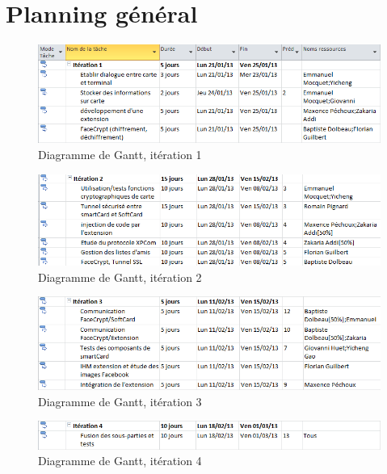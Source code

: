 \documentclass[a4paper,11pt,french]{article}
\begin{document}
\section{Planning général}
\begin{center}
\begin{figure}[!h]
\includegraphics[scale=0.70]{iteration1.png}
\caption{Diagramme de Gantt, itération 1}
\end{figure}
\end{center}

\begin{center}
\begin{figure}[!h]
\includegraphics[scale=0.70]{iteration2.png}
\caption{Diagramme de Gantt, itération 2}
\end{figure}
\end{center}

\begin{center}
\begin{figure}[!h]
\includegraphics[scale=0.70]{iteration3.png}
\caption{Diagramme de Gantt, itération 3}
\end{figure}
\end{center}

\begin{center}
\begin{figure}[!h]
\includegraphics[scale=0.70]{iteration4.png}
\caption{Diagramme de Gantt, itération 4}
\end{figure}
\end{center}
\end{document}
